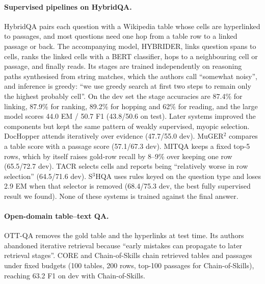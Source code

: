 \paragraph{Supervised pipelines on HybridQA.} HybridQA \citep{chen-etal-2020-hybridqa} pairs each question with a Wikipedia table whose cells are hyperlinked to passages, and most questions need one hop from a table row to a linked passage or back. The accompanying model, HYBRIDER, links question spans to cells, ranks the linked cells with a BERT classifier, hops to a neighbouring cell or passage, and finally reads. Its stages are trained independently on reasoning paths synthesised from string matches, which the authors call ``somewhat noisy'', and inference is greedy: ``we use greedy search at first two steps to remain only the highest probably cell''. On the dev set the stage accuracies are 87.4\% for linking, 87.9\% for ranking, 89.2\% for hopping and 62\% for reading, and the large model scores 44.0 EM / 50.7 F1 (43.8/50.6 on test). Later systems improved the components but kept the same pattern of weakly supervised, myopic selection. DocHopper \citep{sun2021iterative} attends iteratively over evidence (47.7/55.0 dev). MuGER$^2$ \citep{wang-etal-2022-muger2} compares a table score with a passage score (57.1/67.3 dev). MITQA \citep{kumar-etal-2023-multi} keeps a fixed top-5 rows, which by itself raises gold-row recall by 8--9\% over keeping one row (65.5/72.7 dev). TACR \citep{wu-etal-2023-tacr} selects cells and reports being ``relatively worse in row selection'' (64.5/71.6 dev). S$^3$HQA \citep{lei-etal-2023-s3hqa} uses rules keyed on the question type and loses 2.9 EM when that selector is removed (68.4/75.3 dev, the best fully supervised result we found). None of these systems is trained against the final answer.

\paragraph{Open-domain table--text QA.} OTT-QA \citep{chen2021open} removes the gold table and the hyperlinks at test time. Its authors abandoned iterative retrieval because ``early mistakes can propagate to later retrieval stages''. CORE \citep{ma2022open} and Chain-of-Skills \citep{ma2023chain} chain retrieved tables and passages under fixed budgets (100 tables, 200 rows, top-100 passages for Chain-of-Skills), reaching 63.2 F1 on dev with Chain-of-Skills.

